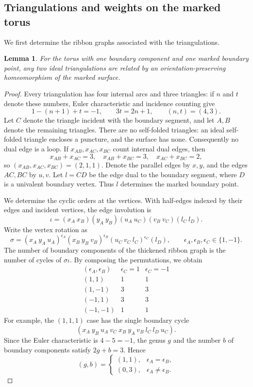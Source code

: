 \documentclass[12pt,a4paper,english,reqno]{amsart}
\theoremstyle{plain}
\newtheorem{lem}[thm]{Lemma}
\theoremstyle{definition}
\numberwithin{equation}{section}
\def\io{\iota}
\def\si{\sigma}
\begin{document}
\subsection{Triangulations and weights on the marked torus}
We first determine the ribbon graphs associated with the triangulations.
\begin{lem}\label{lem:torus-ribbon}
For the torus with one boundary component and one marked boundary point, any two ideal triangulations are related by an orientation-preserving homeomorphism of the marked surface.
\end{lem}
\begin{proof}
Every triangulation has four internal arcs and three triangles: if $n$ and $t$ denote these numbers, Euler characteristic and incidence counting give
\[
 1-(n+1)+t=-1,\qquad 3t=2n+1,
 \qquad (n,t)=(4,3).
\]
Let $C$ denote the triangle incident with the boundary segment, and let $A,B$ denote the remaining triangles. There are no self-folded triangles: an ideal self-folded triangle encloses a puncture, and the surface has none. Consequently no dual edge is a loop. If $x_{AB},x_{AC},x_{BC}$ count internal dual edges, then
\[
 x_{AB}+x_{AC}=3,\quad x_{AB}+x_{BC}=3,\quad x_{AC}+x_{BC}=2,
\]
so $(x_{AB},x_{AC},x_{BC})=(2,1,1)$. Denote the parallel edges by $x,y$, and the edges $AC,BC$ by $u,v$. Let $l=CD$ be the edge dual to the boundary segment, where $D$ is a univalent boundary vertex. Thus $l$ determines the marked boundary point.

We determine the cyclic orders at the vertices. With half-edges indexed by their edges and incident vertices, the edge involution is
\[
 \io=(x_A\ x_B)(y_A\ y_B)(u_A\ u_C)(v_B\ v_C)(l_C\ l_D).
\]
Write the vertex rotation as
\[
 \si=(x_A\ y_A\ u_A)^{\epsilon_A}
         (x_B\ y_B\ v_B)^{\epsilon_B}
         (u_C\ v_C\ l_C)^{\epsilon_C}(l_D),
 \qquad \epsilon_A,\epsilon_B,\epsilon_C\in\{1,-1\}.
\]
The number of boundary components of the thickened ribbon graph is the number of cycles of $\si\io$. By composing the permutations, we obtain
\[
\begin{array}{c|cc}
 (\epsilon_A,\epsilon_B)&\epsilon_C=1&\epsilon_C=-1\\\hline
 (1,1)&1&1\\
 (1,-1)&3&3\\
 (-1,1)&3&3\\
 (-1,-1)&1&1
\end{array}
\]
For example, the $(1,1,1)$ case has the single boundary cycle
\[
 (x_A\ y_B\ u_A\ v_C\ x_B\ y_A\ v_B\ l_C\ l_D\ u_C).
\]
Since the Euler characteristic is $4-5=-1$, the genus $g$ and
the number $b$ of boundary components satisfy $2g+b=3$. Hence
\[
 (g,b)=
 \begin{cases}
 (1,1),&\epsilon_A=\epsilon_B,\\
 (0,3),&\epsilon_A\ne\epsilon_B.
 \end{cases}
\]


\end{proof}
\end{document}
